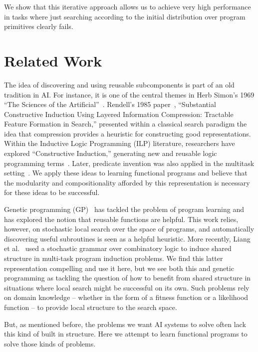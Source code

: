 \documentclass{article}
\begin{document}
We show that this iterative approach allows us to achieve very high
performance in tasks where just searching according to the initial
distribution over program primitives clearly fails.


\section{Related Work}
The idea of discovering and using reusable subcomponents is part of an
old tradition in AI. For instance, it is one of the central themes in
Herb Simon's 1969 ``The Sciences of the
Artificial''~. Rendell's 1985
paper~, ``Substantial Constructive
Induction Using Layered Information Compression: Tractable Feature
Formation in Search,'' presented within a classical search paradigm
the idea that compression provides a heuristic for constructing good
representations. Within the Inductive Logic Programming (ILP)
literature, researchers have explored ``Constructive Induction,''
generating new and reusable logic programming
terms~\cite{DBLP:conf/ijcai/Muggleton87}. Later, predicate invention
was also applied in the multitask
setting~\cite{DBLP:conf/ilp/KhanMP98}. We apply these ideas to
learning functional programs and believe that the modularity and
compositionality afforded by this representation is necessary for
these ideas to be successful.


Genetic programming
(GP)~\cite{DBLP:conf/foga/Koza92,DBLP:conf/ices/KozaBAK96} has
tackled the problem of program learning and has explored the notion
that reusable functions are helpful. This work relies, however, on
stochastic local search over the space of programs, and automatically
discovering useful subroutines is seen as a helpful heuristic. More
recently, Liang et al.~ used a stochastic
grammar over combinatory logic to induce shared structure in
multi-task program induction problems. We find this latter
representation compelling and use it here, but we see both this and
genetic programming as tackling the question of how to benefit from
shared structure in situations where local search might be successful
on its own. Such problems rely on domain knowledge -- whether in the
form of a fitness function or a likelihood function -- to provide
local structure to the search space.

But, as mentioned before, the problems we want AI systems to solve
often lack this kind of built in structure. Here we attempt to learn
functional programs to solve those kinds of problems.  \\
\end{document}
